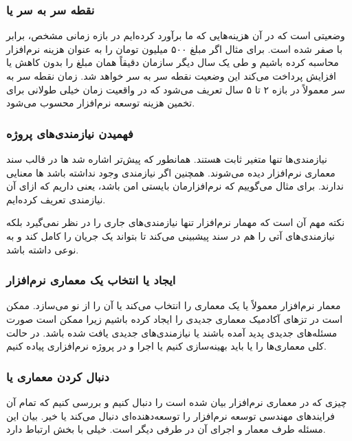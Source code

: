 \subsubsection*{نقطه سر به سر یا }

وضعیتی است که در آن هزینه‌هایی که ما برآورد کرده‌ایم در بازه زمانی مشخص، برابر
با صفر شده است. برای مثال اگر مبلغ ۵۰۰ میلیون تومان را به عنوان هزینه نرم‌افزار
محاسبه کرده باشیم و طی یک سال دیگر سازمان دقیقاً همان مبلغ را بدون کاهش یا
افزایش پرداخت می‌کند این وضعیت نقطه سر به سر خواهد شد. زمان نقطه سر به سر
معمولاً در بازه ۲ تا ۵ سال تعریف می‌شود که در واقعیت زمان خیلی طولانی برای تخمین
هزینه توسعه نرم‌افزار محسوب می‌شود.

\subsubsection{فهمیدن نیازمندی‌های پروژه}

نیازمندی‌ها تنها متغیر ثابت هستند. همانطور که پیش‌تر اشاره شد
ها در قالب سند معماری نرم‌افزار دیده می‌شوند. همچنین اگر
نیازمندی  وجود نداشته باشد ها معنایی ندارند.
برای مثال می‌گوییم که نرم‌افزارمان بایستی امن باشد، یعنی 
داریم که ازای آن نیازمندی  تعریف کرده‌ایم.

نکته مهم آن است که مهمار نرم‌افزار تنها نیازمندی‌های جاری را در نظر نمی‌گیرد
بلکه نیازمندی‌های آتی را هم در سند پیشبینی می‌کند تا بتواند یک جریان را کامل کند
و به نوعی  داشته باشد.

\subsubsection{ایجاد یا انتخاب یک معماری نرم‌افزار}

معمار نرم‌افزار معمولاً یا یک معماری را انتخاب می‌کند یا آن را از نو می‌سازد.
ممکن است در تز‌های آکادمیک معماری جدیدی را ایجاد کرده باشیم زیرا ممکن است صورت
مسئله‌های جدیدی پدید آمده باشند یا نیازمندی‌های  جدیدی یافت شده
باشد. در حالت کلی معماری‌ها را یا باید بهینه‌سازی کنیم یا اجرا و در پروژه
نرم‌افزاری پیاده کنیم.

\subsubsection{دنبال کردن معماری یا }

چیزی که در معماری نرم‌افزار بیان شده است را دنبال کنیم و بررسی کنیم که تمام آن
فرایند‌های مهندسی توسعه نرم‌افزار را توسعه‌دهنده‌ای دنبال می‌کند یا خیر. بیان
این مسئله طرف معمار و اجرای آن در طرفی دیگر است. خیلی با بخش  ارتباط دارد.

